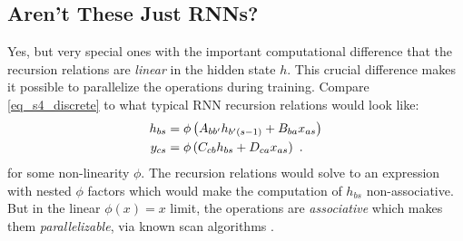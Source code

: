 \subsection{Aren't These Just RNNs?\label{subsec_rnns_and_ssm}}

Yes, but very special ones with the important computational difference that the recursion relations
are \textit{linear} in the hidden state $ h $. This crucial difference makes it possible to
parallelize the operations during training. Compare \eqref{eq_s4_discrete} to what typical RNN
recursion relations would look like:
\begin{align}
    h  _{ bs } &= \phi \left (A  _{ b b' }h _{ b' (s-1) } + B  _{ b a }x  _{ as }\right )\nonumber\\
    y  _{ cs } &= \phi\left (C _{ c b }h  _{ bs } + D _{ c a }x  _{ as }\right ) \label{eq_rnn_comparison} \ .
\end{align}
for some non-linearity $ \phi $.  The recursion relations would solve to an expression with nested
$ \phi $ factors which would make the computation of $ h _{ bs } $ non-associative. But in the linear $
\phi(x) = x$ limit, the operations are \textit{associative} which makes them
\textit{parallelizable}, via known scan algorithms \cite{prefixSumsBlelloch}.





